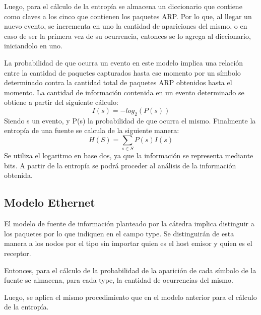 Luego, para el cálculo de la entropía se almacena un diccionario que contiene como claves a los cinco que contienen los paquetes ARP. Por lo que, al llegar un nuevo evento, se incrementa en uno la cantidad de apariciones del mismo, o en caso de ser la primera vez de su ocurrencia, entonces se lo agrega al diccionario, iniciandolo en uno.

La probabilidad de que ocurra un evento en este modelo implica una relación entre la cantidad de paquetes capturados hasta ese momento por un símbolo determinado contra la cantidad total de paquetes ARP obtenidos hasta el momento. 
La cantidad de información contenida en un evento determinado se obtiene a partir del siguiente cálculo: 
\begin{equation}
 I(s) = -log_{2}(P(s))
\end{equation}
Siendo s un evento, y P(s) la probabilidad de que ocurra el mismo. 
Finalmente la entropía de una fuente se calcula de la siguiente manera: 
\begin{equation}
 H(S) = \sum_{s \in S} P(s) I(s)
\end{equation}
Se utiliza el logaritmo en base dos, ya que la información se representa mediante bits. A partir de la entropía se podrá proceder al análisis de la información obtenida.


\subsection{Modelo Ethernet}
El modelo de fuente de información planteado por la cátedra implica distinguir a los paquetes por lo que indiquen en el campo type. Se distinguirán de esta manera a los nodos por el tipo sin importar quien es el host emisor y quien es el receptor. 

Entonces, para el cálculo de la probabilidad de la aparición de cada símbolo de la fuente se almacena, para cada type, la cantidad de ocurrencias del mismo.

Luego, se aplica el mismo procedimiento que en el modelo anterior para el cálculo de la entropía.